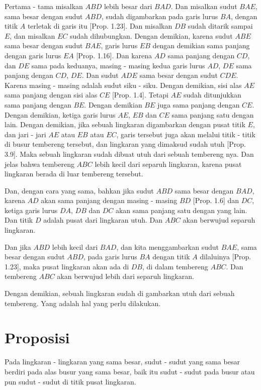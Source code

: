 \documentclass[a4paper]{book}
\begin{document}
Pertama - tama misalkan $ABD$ lebih besar dari $BAD$. Dan misalkan sudut 
$BAE$, sama besar dengan sudut $ABD$, sudah digambarkan pada garis lurus
$BA$, dengan titik $A$ terletak di garis itu [Prop. 1.23]. Dan misalkan
$DB$ sudah ditarik sampai $E$, dan misalkan $EC$ sudah dihubungkan. Dengan
demikian, karena sudut $ABE$ sama besar dengan sudut $BAE$, garis lurus $EB$
dengan demikian sama panjang dengan garis lurus $EA$ [Prop. 1.16]. Dan karena
$AD$ sama panjang dengan $CD$, dan $DE$ sama pada keduanya, masing - masing kedua garis 
lurus $AD$, $DE$ sama panjang dengan $CD$, $DE$. Dan sudut $ADE$ sama besar
dengan sudut $CDE$. Karena masing - masing adalah sudut siku - siku. Dengan
demikian, sisi alas $AE$ sama panjang dengan sisi alas $CE$ [Prop. 1.4]. 
Tetapi $AE$ sudah ditunjukkan sama panjang dengan $BE$. Dengan demikian $BE$
juga sama panjang dengan $CE$. Dengan demikian, ketiga garis lurus $AE$, $EB$
dan $CE$ sama panjang satu dengan lain. Dengan demikian, jika sebuah lingkaran
digambarkan dengan pusat titik $E$, dan jari - jari  $AE$ atau $EB$ atau $EC$,
garis tersebut juga akan melalui titik - titik di busur tembereng tersebut, 
dan lingkaran yang dimaksud sudah utuh [Prop. 3.9]. Maka sebuah lingkaran
sudah dibuat utuh dari sebuah tembereng nya. Dan jelas bahwa tembereng $ABC$
lebih kecil dari separuh lingkaran, karena pusat lingkaran berada di luar
tembereng tersebut.

Dan, dengan cara yang sama, bahkan jika sudut $ABD$ sama besar dengan $BAD$,
karena $AD$ akan sama panjang dengan masing - masing $BD$ [Prop. 1.6] dan $DC$,
ketiga garis lurus $DA$, $DB$ dan $DC$ akan sama panjang satu dengan yang lain.
Dan titik $D$ adalah pusat dari lingkaran utuh. Dan $ABC$ akan berwujud separuh
lingkaran.

Dan jika $ABD$ lebih kecil dari $BAD$, dan kita menggambarkan sudut $BAE$, sama
besar dengan sudut $ABD$, pada garis lurus $BA$ dengan titik $A$ dilaluinya
[Prop. 1.23], maka pusat lingkaran akan ada di $DB$, di dalam tembereng $ABC$.
Dan tembereng $ABC$ akan berwujud lebih dari separuh lingkaran.

Dengan demikian, sebuah lingkaran sudah di gambarkan utuh dari sebuah tembereng.
Yang adalah hal yang perlu dilakukan.

\section*{\centering Proposisi \thesection}
Pada lingkaran - lingkaran yang sama besar, sudut - sudut yang sama besar 
berdiri pada alas busur yang sama besar, baik itu sudut - sudut pada busur atau pun 
sudut - sudut di titik pusat lingkaran.
\end{document}
